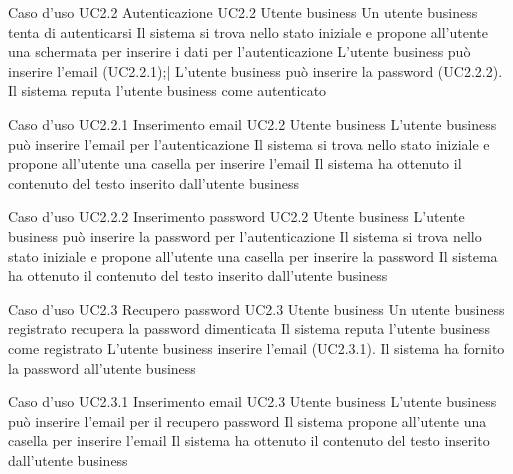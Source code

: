 \UCtitle
{Caso d'uso UC2.2}
{Autenticazione}
\UC
{UC2.2}
{Utente business}
{Un utente business tenta di autenticarsi}
{Il sistema si trova nello stato iniziale e propone all'utente una schermata per inserire i dati per l'autenticazione}
\scenario
{
L'utente business può inserire l'email (UC2.2.1);|
L'utente business può inserire la password (UC2.2.2).
}
\post
{Il sistema reputa l'utente business come autenticato}

\UCtitle
{Caso d'uso UC2.2.1}
{Inserimento email}
\UC
{UC2.2}
{Utente business}
{L'utente business può inserire l'email per l'autenticazione}
{Il sistema si trova nello stato iniziale e propone all'utente una casella per inserire l'email}
\post
{Il sistema ha ottenuto il contenuto del testo inserito dall'utente business}

\UCtitle
{Caso d'uso UC2.2.2}
{Inserimento password}
\UC
{UC2.2}
{Utente business}
{L'utente business può inserire la password per l'autenticazione}
{Il sistema si trova nello stato iniziale e propone all'utente una casella per inserire la password}
\post
{Il sistema ha ottenuto il contenuto del testo inserito dall'utente business}

\UCtitle
{Caso d'uso UC2.3}
{Recupero password}
\UC
{UC2.3}
{Utente business}
{Un utente business registrato recupera la password dimenticata}
{Il sistema  reputa l'utente business come registrato}
\scenario
{L'utente business inserire l'email (UC2.3.1).
}
\post
{Il sistema ha fornito la password all'utente business}

\UCtitle
{Caso d'uso UC2.3.1}
{Inserimento email}
\UC
{UC2.3}
{Utente business}
{L'utente business può inserire l'email per il recupero password}
{Il sistema propone all'utente una casella per inserire l'email}
\post
{Il sistema ha ottenuto il contenuto del testo inserito dall'utente business}


